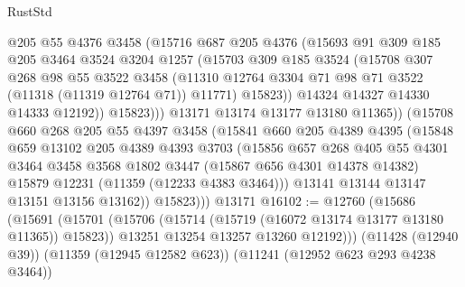 \begin{lexlean}{RustStd}
\begin{coremodule}
{{{{{{{{{{{{{{{{{{{                  @205
                  @55
                  @4376
                  @3458
                  (@15716
                    @687
                    @205
                    @4376
                    (@15693
                      @91
                      @309
                      @185
                      @205
                      @3464
                      @3524
                      @3204
                      @1257
                      (@15703
                        @309
                        @185
                        @3524
                        (@15708
                          @307
                          @268
                          @98
                          @55
                          @3522
                          @3458
                          (@11310
                            @12764
                            @3304
                            @71
                            @98
                            @71
                            @3522
                            (@11318 (@11319 @12764 @71))
                            @11771)
                          @15823))
                      @14324
                      @14327
                      @14330
                      @14333
                      @12192))
                  @15823)))
            @13171
            @13174
            @13177
            @13180
            @11365))
        (@15708
          @660
          @268
          @205
          @55
          @4397
          @3458
          (@15841
            @660
            @205
            @4389
            @4395
            (@15848
              @659
              @13102
              @205
              @4389
              @4393
              @3703
              (@15856
                @657
                @268
                @405
                @55
                @4301
                @3464
                @3458
                @3568
                @1802
                @3447
                (@15867 @656 @4301 @14378 @14382)
                @15879
                @12231
                (@11359 (@12233 @4383 @3464)))
              @13141
              @13144
              @13147
              @13151
              @13156
              @13162))
          @15823)))
    @13171
@16102 := @12760
    (@15686
      (@15691
        (@15701
          (@15706 (@15714 (@15719 (@16072 @13174 @13177 @13180 @11365)) @15823))
          @13251
          @13254
          @13257
          @13260
          @12192)))
    (@11428 (@12940 @39))
    (@11359 (@12945 @12582 @623))
    (@11241 (@12952 @623 @293 @4238 @3464))
}}}}}}}}}}}}}}}}}}}
\end{coremodule}
\end{lexlean}

